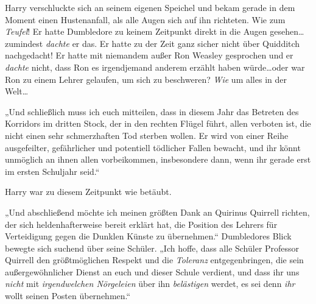Harry verschluckte sich an seinem eigenen Speichel und bekam gerade in dem Moment einen Hustenanfall, als alle Augen sich auf ihn richteten. Wie zum \emph{Teufel}! Er hatte Dumbledore zu keinem Zeitpunkt direkt in die Augen gesehen…zumindest \emph{dachte} er das. Er hatte zu der Zeit ganz sicher nicht über Quidditch nachgedacht! Er hatte mit niemandem außer Ron Weasley gesprochen und er \emph{dachte} nicht, dass Ron es irgendjemand anderem erzählt haben würde…oder war Ron zu einem Lehrer gelaufen, um sich zu beschweren? \emph{Wie} um alles in der Welt…

„Und schließlich muss ich euch mitteilen, dass in diesem Jahr das Betreten des Korridors im dritten Stock, der in den rechten Flügel führt, allen verboten ist, die nicht einen sehr schmerzhaften Tod sterben wollen. Er wird von einer Reihe ausgefeilter, gefährlicher und potentiell tödlicher Fallen bewacht, und ihr könnt unmöglich an ihnen allen vorbeikommen, insbesondere dann, wenn ihr gerade erst im ersten Schuljahr seid.“

Harry war zu diesem Zeitpunkt wie betäubt.

„Und abschließend möchte ich meinen größten Dank an Quirinus Quirrell richten, der sich heldenhafterweise bereit erklärt hat, die Position des Lehrers für Verteidigung gegen die Dunklen Künste zu übernehmen.“ Dumbledores Blick bewegte sich suchend über seine Schüler. „Ich hoffe, dass alle Schüler Professor Quirrell den größtmöglichen Respekt und die \emph{Toleranz} entgegenbringen, die sein außergewöhnlicher Dienst an euch und dieser Schule verdient, und dass ihr uns \emph{nicht} mit \emph{irgendwelchen Nörgeleien} über ihn \emph{belästigen} werdet, es sei denn \emph{ihr} wollt seinen Posten übernehmen.“

